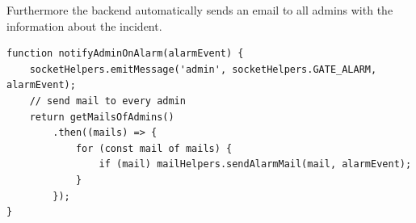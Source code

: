 Furthermore the backend automatically sends an email to all admins with the information about the incident.

\begin{lstlisting}[label=notifyOnAlarm]
function notifyAdminOnAlarm(alarmEvent) {
    socketHelpers.emitMessage('admin', socketHelpers.GATE_ALARM, alarmEvent);
    // send mail to every admin
    return getMailsOfAdmins()
        .then((mails) => {
            for (const mail of mails) {
                if (mail) mailHelpers.sendAlarmMail(mail, alarmEvent);
            }
        });
}
\end{lstlisting}

\clearpage
